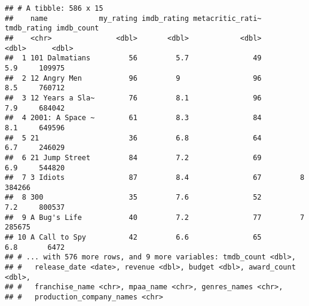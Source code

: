 \documentclass[
]{article}
\begin{document}
\begin{verbatim}
## # A tibble: 586 x 15
##    name            my_rating imdb_rating metacritic_rati~ tmdb_rating imdb_count
##    <chr>               <dbl>       <dbl>            <dbl>       <dbl>      <dbl>
##  1 101 Dalmatians         56         5.7               49         5.9     109975
##  2 12 Angry Men           96         9                 96         8.5     760712
##  3 12 Years a Sla~        76         8.1               96         7.9     684042
##  4 2001: A Space ~        61         8.3               84         8.1     649596
##  5 21                     36         6.8               64         6.7     246029
##  6 21 Jump Street         84         7.2               69         6.9     544820
##  7 3 Idiots               87         8.4               67         8       384266
##  8 300                    35         7.6               52         7.2     800537
##  9 A Bug's Life           40         7.2               77         7       285675
## 10 A Call to Spy          42         6.6               65         6.8       6472
## # ... with 576 more rows, and 9 more variables: tmdb_count <dbl>,
## #   release_date <date>, revenue <dbl>, budget <dbl>, award_count <dbl>,
## #   franchise_name <chr>, mpaa_name <chr>, genres_names <chr>,
## #   production_company_names <chr>
\end{verbatim}
\end{document}
